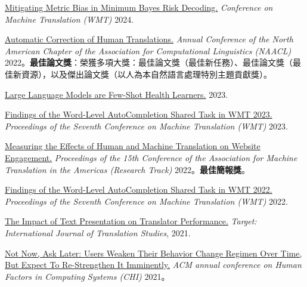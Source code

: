 \href{https://aclanthology.org/2024.wmt-1.109.pdf}{Mitigating Metric Bias in Minimum Bayes Risk Decoding.} \emph{Conference on Machine Translation (WMT)} 2024.

\href{https://aclanthology.org/2022.naacl-main.36.pdf}{Automatic Correction of Human Translations.} \emph{Annual Conference of the North American Chapter of the Association for Computational Linguistics (NAACL)} 2022。\textbf{最佳論文獎}：榮獲多項大獎：最佳論文獎（最佳新任務）、最佳論文獎（最佳新資源），以及傑出論文獎（以人為本自然語言處理特別主題貢獻獎）。 %

\href{https://arxiv.org/pdf/2305.15525}{Large Language Models are Few-Shot Health Learners.} 2023.

\href{https://aclanthology.org/2023.wmt-1.53.pdf}{Findings of the Word-Level AutoCompletion Shared Task in WMT 2023.} \emph{Proceedings of the Seventh Conference on Machine Translation (WMT)} 2023.

\href{https://aclanthology.org/2022.amta-research.23.pdf}{Measuring the Effects of Human and Machine Translation on Website Engagement.} \emph{Proceedings of the 15th Conference of the Association for Machine Translation in the Americas (Research Track)} 2022。\textbf{最佳簡報獎}。

\href{https://aclanthology.org/2022.wmt-1.75.pdf}{Findings of the Word-Level AutoCompletion Shared Task in WMT 2022.} \emph{Proceedings of the Seventh Conference on Machine Translation (WMT)} 2022.

\href{https://arxiv.org/pdf/2011.05978.pdf}{The Impact of Text Presentation on Translator Performance.} \emph{Target: International Journal of Translation Studies}, 2021.

\href{https://hci.stanford.edu/publications/2021/notnow/notnowasklater.pdf}{Not Now, Ask Later: Users Weaken Their Behavior Change Regimen Over Time, But Expect To Re-Strengthen It Imminently.} \emph{ACM annual conference on Human Factors in Computing Systems (CHI)} 2021。%

